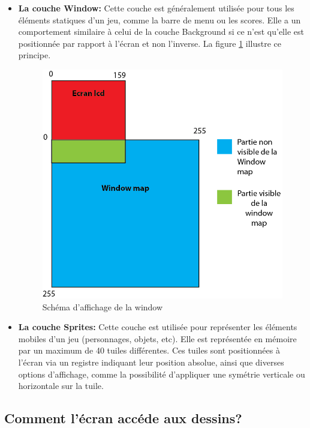 \documentclass{report}
\begin{document}
\begin{itemize}
\item \textbf{La couche Window:}
	Cette couche est généralement utilisée pour tous les éléments statiques
d'un jeu, comme la barre de menu ou les scores. Elle a un comportement
similaire à celui de la couche Background si ce n'est qu'elle est positionnée par rapport à l'écran et non l'inverse. La figure \ref{window} illustre ce principe.\\

\begin{figure}[!h]
\centering
\includegraphics[scale=0.8]{images/window.png}
\caption{Schéma d'affichage de la window}
\label{window}
\end{figure}

\item \textbf{La couche Sprites:}
	Cette couche est utilisée pour représenter les éléments mobiles d'un jeu (personnages, objets, etc). Elle est représentée en mémoire par un maximum
de 40 tuiles différentes. Ces tuiles sont positionnées à l'écran via un registre indiquant leur position absolue, ainsi que diverses options d'affichage, comme la possibilité d'appliquer une symétrie verticale ou horizontale sur la tuile.\\
\end{itemize}

\subsection{Comment l'écran accéde aux dessins?}
\end{document}
